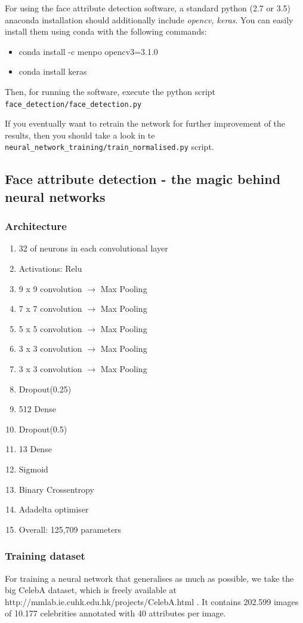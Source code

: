 \documentclass[12.5pt]{scrartcl}
\begin{document}
	
	For using the face attribute detection software, a standard python (2.7 or 3.5) anaconda installation should additionally include \textit{opencv, keras}. You can easily install them using conda with the following commands:
	\begin{itemize}
	\item conda install -c menpo opencv3=3.1.0
	\item conda install keras
	\end{itemize}
	Then, for running the software, execute the python script \texttt{face\_detection/face\_detection.py}
	
	If you eventually want to retrain the network for further improvement of the results, then you should take a look in te \texttt{neural\_network\_training/train\_normalised.py} script.
	\subsection{Face attribute detection - the magic behind neural networks}
	\subsubsection{Architecture}
	\begin{enumerate}
		\item 	32 of neurons in each convolutional layer
		\item Activations: Relu
		\item 9 x 9 convolution $\rightarrow$ Max Pooling
		\item	7 x 7 convolution $\rightarrow$  Max Pooling
		\item	5 x 5 convolution $\rightarrow$  Max Pooling
		\item	3 x 3 convolution $\rightarrow$  Max Pooling
		\item	3 x 3 convolution $\rightarrow$  Max Pooling
		\item	Dropout(0.25)
		\item	512 Dense
		\item	Dropout(0.5)
		\item	13 Dense
		\item	Sigmoid
		\item	Binary Crossentropy
		\item	Adadelta optimiser
		\item Overall: 125,709 parameters
	\end{enumerate}
	\subsubsection{Training dataset}
	For training a neural network that generalises as much as possible, we take the big CelebA dataset, which is freely available at http://mmlab.ie.cuhk.edu.hk/projects/CelebA.html . It contains 202.599 images of 10.177 celebrities annotated with 40 attributes per image.
\end{document}
